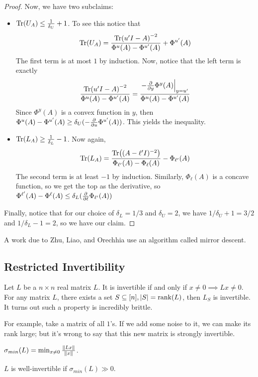 \begin{proof}
    Now, we have two subclaims:
    \begin{itemize}
        \item $\Tr(U_A) \le \frac{1}{\delta_U} + 1$. To see this notice that
        \[ \Tr(U_A) = \frac{\Tr(u'I -A)^{-2}}{\Phi^u(A) - \Phi^{u'}(A)} + \Phi^{u'}(A)\]
        The first term is at most $1$ by induction. Now, notice that the left term is exactly
        \[ \frac{\Tr(u'I -A)^{-2}}{\Phi^u(A) - \Phi^{u'}(A)} = \frac{-\pdv{}{y} \Phi^{y}(A) \Big|_{y = u'}}{\Phi^{u}(A) - \Phi^{u'}(A)} \]
        Since $\Phi^{y}(A)$ is a convex function in $y$, then $\Phi^{u}(A) - \Phi^{u'}(A) \ge \delta_U(-\pdv{}{u} \Phi^{u'}(A))$.
        This yields the inequality.
        \item $\Tr(L_A) \ge \frac{1}{\delta_L} - 1$. Now again,
        \[ \Tr(L_A) = \frac{\Tr((A - \ell' I)^{-2})}{\Phi_{\ell'}(A) - \Phi_{\ell}(A)} - \Phi_{\ell'}(A) \]
        The second term is at least $-1$ by induction.
        Similarly, $\Phi_{\ell}(A)$ is a concave function, so we get the top as the derivative,
        so $\Phi^{\ell'}(A) - \Phi^{\ell}(A) \le \delta_L( \pdv{}{\ell} \Phi_{\ell'}(A))$
    \end{itemize} 
    Finally, notice that for our choice of $\delta_L = 1/3$ and $\delta_U = 2$, we have $1/\delta_U + 1 = 3/2$
    and $1/\delta_L - 1 = 2$, so we have our claim.

\end{proof}

A work due to Zhu, Liao, and Orechhia use an algorithm called mirror descent.

\subsection{Restricted Invertibility}
Let $L$ be a $n\times n$ real matrix $L$. It is invertible if
and only if $x \neq 0 \implies Lx \neq 0$. For any matrix $L$,
there exists a set $S \subseteq [n], |S| =\rank(L)$,
then $L_S$ is invertible. It turns out such a property is incredibly brittle.

For example, take a matrix of all $1$'s. If we add some noise to it, we can make its rank
large; but it's wrong to say that this new matrix is strongly invertible.

\begin{definition}
    $\sigma_{min}(L) = \min_{x \neq 0} \frac{\norm{Lx}}{\norm{x}}$.
\end{definition}

\begin{definition}
    $L$ is well-invertible if $\sigma_{min}(L) \gg 0$.
\end{definition}

